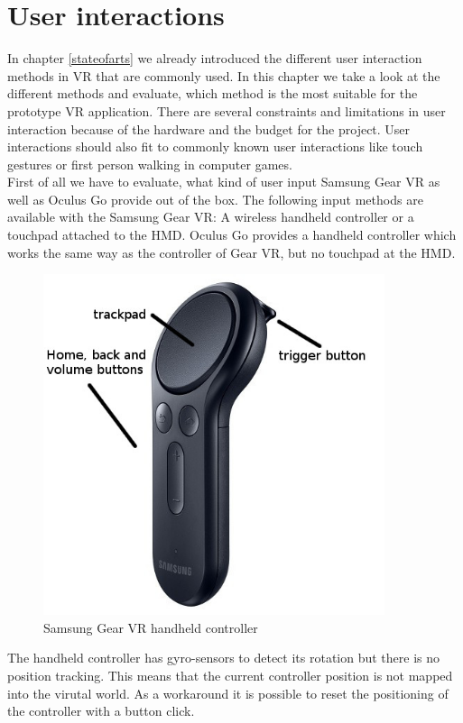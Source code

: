 \section{User interactions}
In chapter \ref{stateofarts} we already introduced the different user interaction methods in VR that are commonly used. In this chapter we take a look at the different methods and evaluate, which method is the most suitable for the prototype VR application. There are several constraints and limitations in user interaction because of the hardware and the budget for the project. User interactions should also fit to commonly known user interactions like touch gestures or first person walking in computer games.\\
First of all we have to evaluate, what kind of user input Samsung Gear VR as well as Oculus Go provide out of the box.
The following input methods are available with the Samsung Gear VR: A wireless handheld controller or a touchpad attached to the HMD. Oculus Go provides a handheld controller which works the same way as the controller of Gear VR, but no touchpad at the HMD.\\
\begin{figure}[h!]
  \includegraphics[width=10cm]{kapitel/samsung-controller.jpg}
  \centering
  \caption{Samsung Gear VR handheld controller \cite{Samsung.2019b}}
  \label{fig:samsung-controller}
\end{figure}
The handheld controller has gyro-sensors to detect its rotation but there is no position tracking. This means that the current controller  position is not mapped into the virutal world. As a workaround it is possible to reset the positioning of the controller with a button click.
